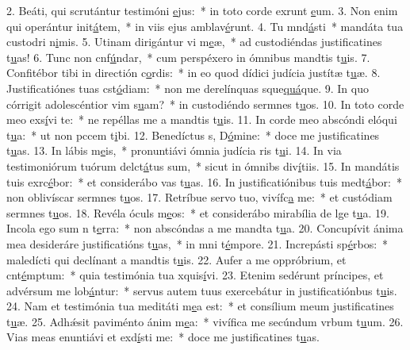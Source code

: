 2. Beáti, qui scrutántur testimóni \uline{e}jus:~* in toto corde exrunt \uline{e}um.
3. Non enim qui operántur init\uline{á}tem,~* in viis ejus amblav\uline{é}runt.
4. Tu mnd\uline{á}sti~* mandáta tua custodri n\uline{i}mis.
5. Utinam dirigántur vi m\uline{e}æ,~* ad custodiéndas justificatines t\uline{u}as!
6. Tunc non cnf\uline{ú}ndar,~* cum perspéxero in ómnibus mandtis t\uline{u}is.
7. Confitébor tibi in directión c\uline{o}rdis:~* in eo quod dídici judícia justítæ t\uline{u}æ.
8. Justificatiónes tuas cst\uline{ó}diam:~* non me derelínquas sque\uline{quá}que.
9. In quo córrigit adolescéntior vim s\uline{u}am?~* in custodiéndo sermnes t\uline{u}os.
10. In toto corde meo exs\uline{í}vi te:~* ne repéllas me a mandtis t\uline{u}is.
11. In corde meo abscóndi elóqui t\uline{u}a:~* ut non pccem t\uline{i}bi.
12. Benedíctus s, D\uline{ó}mine:~* doce me justificatines t\uline{u}as.
13. In lábis m\uline{e}is,~* pronuntiávi ómnia judícia ris t\uline{u}i.
14. In via testimoniórum tuórum delct\uline{á}tus sum,~* sicut in ómnibs div\uline{í}tiis.
15. In mandátis tuis exrc\uline{é}bor:~* et considerábo vas t\uline{u}as.
16. In justificatiónibus tuis medt\uline{á}bor:~* non oblivíscar sermnes t\uline{u}os.
17. Retríbue servo tuo, vivífc\uline{a} me:~* et custódiam sermnes t\uline{u}os.
18. Revéla óculs m\uline{e}os:~* et considerábo mirabília de lge t\uline{u}a.
19. Incola ego sum n t\uline{e}rra:~* non abscóndas a me mandta t\uline{u}a.
20. Concupívit ánima mea desideráre justificatións t\uline{u}as,~* in mni t\uline{é}mpore.
21. Increpásti sp\uline{é}rbos:~* maledícti qui declínant a mandtis t\uline{u}is.
22. Aufer a me oppróbrium, et cnt\uline{é}mptum:~* quia testimónia tua xquis\uline{í}vi.
23. Etenim sedérunt príncipes, et advérsum me lob\uline{á}ntur:~* servus autem tuus exercebátur in justificatiónbus t\uline{u}is.
24. Nam et testimónia tua meditáti m\uline{e}a est:~* et consílium meum justificatines t\uline{u}æ.
25. Adhǽsit paviménto ánim m\uline{e}a:~* vivífica me secúndum vrbum t\uline{u}um.
26. Vias meas enuntiávi et exd\uline{í}sti me:~* doce me justificatines t\uline{u}as.

